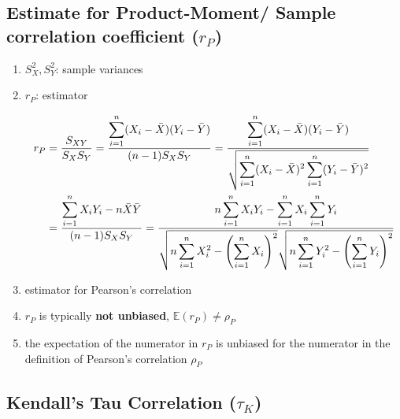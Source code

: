 \subsection{Estimate for Product-Moment/ Sample correlation coefficient ($r_P$) \cite{ism-1}} \label{Multivariate Distributions: Estimate for Product-Moment/ Sample correlation coefficient}

\begin{enumerate}
    \item[] $S_X^2 , S_Y^2$: sample variances
    \item[] $r_P$: estimator

    \begin{align*}
        r_P
        &= \dfrac{S_{XY}}{S_X S_Y}
        = \dfrac{
            \displaystyle\sum_{i=1}^{n} (X_i - \bar{X})(Y_i - \bar{Y})
        }{(n-1)S_X S_Y}
        = \dfrac{
            \displaystyle\sum_{i=1}^{n} (X_i - \bar{X})(Y_i - \bar{Y})
        }{\sqrt{
            \displaystyle\sum_{i=1}^{n} (X_i - \bar{X})^2
            \displaystyle\sum_{i=1}^{n} (Y_i - \bar{Y})^2
        }}\\
        &= \dfrac{
            \displaystyle\sum_{i=1}^{n} X_iY_i - 
            n\bar{X}\bar{Y}
        }{(n-1)S_X S_Y}
        = \dfrac{
            n\displaystyle\sum_{i=1}^n X_iY_i - \displaystyle\sum_{i=1}^n X_i \displaystyle\sum_{i=1}^n Y_i
        }{\sqrt{
            n\displaystyle\sum_{i=1}^{n} X_i^2 - \left(\displaystyle\sum_{i=1}^{n} X_i\right)^2
        }\sqrt{
            n\displaystyle\sum_{i=1}^{n} Y_i^2 - \left(\displaystyle\sum_{i=1}^{n} Y_i\right)^2
        }}
    \end{align*}

    \item estimator for Pearson’s correlation

    \item $r_P$ is typically \textbf{not unbiased}, $\mathbb{E}(r_P) \neq \rho_P$
    
    \item the expectation of the numerator in $r_P$ is unbiased for the numerator in the definition of Pearson’s correlation $\rho_P$
\end{enumerate}



\subsection{Kendall’s Tau Correlation ($\tau_K$) \cite{ism-1}} \label{Multivariate Distributions: Kendall’s Tau Correlation}

